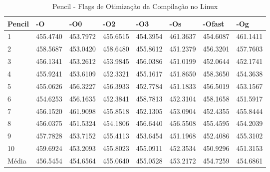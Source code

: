 \begin{table}[!ht]
\centering
\caption{Pencil - Flags de Otimização da Compilação no Linux}
\label{tab:otimizacao_compilacao:linux:pencil}
\begin{tabular}{llllllll}
\textbf{Pencil}            & \textbf{-O}  & \textbf{-O0}   & \textbf{-O2} & \textbf{-O3} & \textbf{-Os} & \textbf{-Ofast} & \textbf{-Og} \\ \toprule
1                          & 455.4740     &   453.7972     &  455.6515    &   454.3954   &   461.3637   &   454.6087      &   461.1411       \\ 
2                          & 458.5687     &   453.0420     &  458.6480    &   455.8612   &   451.2379   &   456.3201      &   457.7603       \\ 
3                          & 456.1341     &   453.2612     &  453.9845    &   456.0386   &   451.0199   &   452.0644      &   452.1741       \\ 
4                          & 455.9241     &   453.6109     &  452.3321    &   455.1617   &   451.8650   &   458.3650      &   454.3638       \\ 
5                          & 455.0626     &   456.3227     &  456.3933    &   452.7784   &   451.1833   &   456.5019      &   453.1567       \\ 
6                          & 454.6253     &   456.1635     &  452.3841    &   458.7813   &   452.3104   &   458.1658      &   451.5917       \\ 
7                          & 456.1520     &   461.9098     &  455.8518    &   452.1305   &   453.0904   &   452.4355      &   455.8444       \\ 
8                          & 456.0375     &   451.5324     &  454.1806    &   456.6440   &   456.5508   &   455.4595      &   454.2039       \\ 
9                          & 457.7828     &   453.7152     &  455.4113    &   453.6454   &   451.1968   &   452.4086      &   455.3102       \\ 
10                         & 459.6924     &   453.2093     &  455.8023    &   455.0911   &   452.3534   &   450.9296      &   451.3153       \\ \bottomrule
Média                      & 456.5454     &   454.6564     &  455.0640    &   455.0528   &   453.2172   &   454.7259      &   454.6861       \\ 
\end{tabular}
\end{table}


